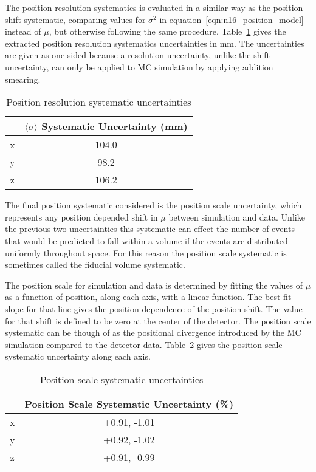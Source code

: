 The position resolution systematics is evaluated in a similar way as the position
shift systematic, comparing values for
$\sigma^{2}$ in equation~\eqref{eqn:n16_position_model} instead of $\mu$,
but otherwise following the same procedure.
Table~\ref{tbl:position_resolution_systs} gives the extracted position resolution systematics uncertainties
in $\text{mm}$. The uncertainties are given as one-sided because a resolution uncertainty,
unlike the shift uncertainty,
can only be applied to MC simulation by applying addition smearing.
\begin{table}
    \centering
    \begin{tabular}{|c|c|}
            \hline
            &$\langle \sigma \rangle$ Systematic Uncertainty (mm)\\
            \hline
            x&104.0\\
            y&98.2\\
            z&106.2\\
            \hline
    \end{tabular}
    \caption{Position resolution systematic uncertainties}
    \label{tbl:position_resolution_systs}
\end{table}


The final position systematic considered is the position scale uncertainty,
which represents any position depended shift in $\mu$ between simulation
and data. Unlike the previous two uncertainties this systematic can effect the
number of events that would be predicted to fall within a volume if the
events are distributed uniformly throughout space. For this reason the position
scale systematic is sometimes called the fiducial volume systematic.

The position scale for simulation and data is determined by fitting the values
of $\mu$ as a function of position, along each axis, with a linear function.
The best fit slope for that line gives the position dependence of the position
shift. The value for that shift is defined to be zero at the center
of the detector. The position scale systematic can be though of as the
positional divergence introduced by the MC simulation compared to the detector
data. Table~\ref{tbl:position_scale_systs} gives the position scale systematic
uncertainty along each axis.

\begin{table}
    \centering
    \begin{tabular}{|c|c|}
            \hline
            &Position Scale Systematic Uncertainty (\%)\\
            \hline
            x&+0.91, -1.01\\
            y&+0.92, -1.02\\
            z&+0.91, -0.99\\
            \hline
    \end{tabular}
    \caption{Position scale systematic uncertainties}
    \label{tbl:position_scale_systs}
\end{table}

